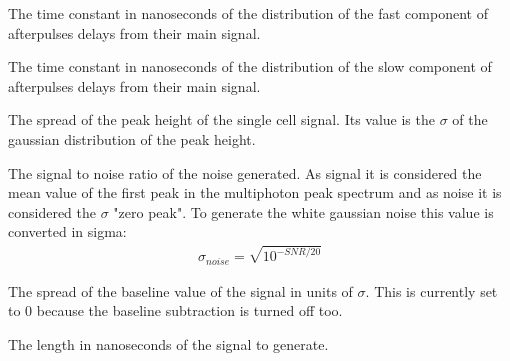 \documentclass[letterpaper,10pt,english]{sphinxmanual}
\begin{document}
\begin{fulllineitems}
The time constant in nanoseconds of the distribution of the fast component of afterpulses delays from their main signal.

\end{fulllineitems}



\begin{fulllineitems}
The time constant in nanoseconds of the distribution of the slow component of afterpulses delays from their main signal.

\end{fulllineitems}



\begin{fulllineitems}
The spread of the peak height of the single cell signal. Its value is the \(\sigma\) of the gaussian distribution of the peak height.

\end{fulllineitems}



\begin{fulllineitems}
The signal to noise ratio of the noise generated. As signal it is considered the mean value of the first peak in the multi\sphinxhyphen{}photon peak spectrum and as noise it is considered the \(\sigma\) "zero peak".
To generate the white gaussian noise this value is converted in sigma:
\begin{equation*}
\begin{split}\sigma_{noise} = \sqrt{10^{-SNR/20}}\end{split}
\end{equation*}
\end{fulllineitems}



\begin{fulllineitems}
The spread of the baseline value of the signal in units of \(\sigma\). This is currently set to 0 because the baseline subtraction is turned off too.

\end{fulllineitems}



\begin{fulllineitems}
The length in nanoseconds of the signal to generate.

\end{fulllineitems}
\end{document}
